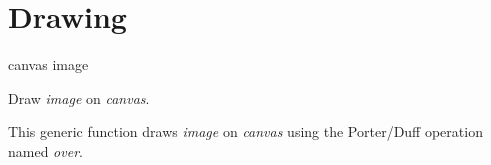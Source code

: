 \chapter{Drawing}
\label{chap-drawing}

 {canvas image}

Draw \textit{image} on \textit{canvas}.

This generic function draws \textit{image} on \textit{canvas} using
the Porter/Duff operation named \emph{over}.
